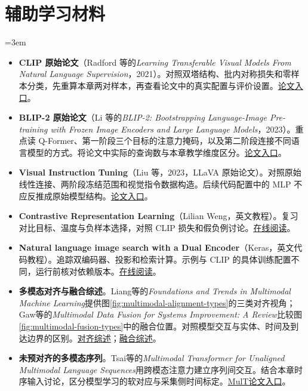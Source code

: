 \section*{辅助学习材料}
\begingroup
\small
\emergencystretch=3em
\begin{itemize}[leftmargin=*]
\item \textbf{CLIP 原始论文}（Radford 等的\textit{Learning Transferable Visual Models From Natural Language Supervision}，2021）。对照双塔结构、批内对称损失和零样本分类，先重算本章两对样本，再查看论文中的真实配置与评价设置。\href{https://arxiv.org/abs/2103.00020v1}{论文入口}。
\item \textbf{BLIP-2 原始论文}（Li 等的\textit{BLIP-2: Bootstrapping Language-Image Pre-training with Frozen Image Encoders and Large Language Models}，2023）。重点读 Q-Former、第一阶段三个目标的注意力掩码，以及第二阶段连接不同语言模型的方式。将论文中实际的查询数与本章教学维度区分。\href{https://arxiv.org/abs/2301.12597v3}{论文入口}。
\item \textbf{Visual Instruction Tuning}（Liu 等，2023，LLaVA 原始论文）。对照原始线性连接、两阶段冻结范围和视觉指令数据构造。后续代码配置中的 MLP 不应反推成原始模型结构。\href{https://arxiv.org/abs/2304.08485v2}{论文入口}。
\item \textbf{Contrastive Representation Learning}（Lilian Weng，英文教程）。复习对比目标、温度与负样本选择，对照 CLIP 损失和假负例讨论。\href{https://lilianweng.github.io/posts/2021-05-31-contrastive/}{在线阅读}。
\item \textbf{Natural language image search with a Dual Encoder}（Keras，英文代码教程）。追踪双编码器、投影和检索计算。示例与 CLIP 的具体训练配置不同，运行前核对依赖版本。\href{https://keras.io/examples/vision/nl\_image\_search/}{在线阅读}。
\item \textbf{多模态对齐与融合综述}。Liang等的\textit{Foundations and Trends in Multimodal Machine Learning}提供图\ref{fig:multimodal-alignment-types}的三类对齐视角；Gaw等的\textit{Multimodal Data Fusion for Systems Improvement: A Review}比较图\ref{fig:multimodal-fusion-types}中的融合位置。对照模型交互与实体、时间及到达边界的区别。\href{https://arxiv.org/abs/2209.03430v2}{对齐综述}；\href{https://doi.org/10.1080/24725854.2021.1987593}{融合综述}。
\item \textbf{未预对齐的多模态序列}。Tsai等的\textit{Multimodal Transformer for Unaligned Multimodal Language Sequences}用跨模态注意力建立序列间交互。结合本章时序输入讨论，区分模型学习的软对应与采集侧时间标定。\href{https://aclanthology.org/P19-1656/}{MulT论文入口}。
\end{itemize}
\endgroup
